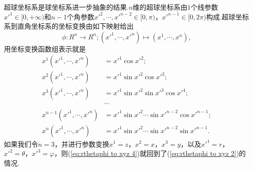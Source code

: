 		超球坐标系是球坐标系进一步抽象的结果.$n$维的超球坐标系由$1$个线参数$x'^1\in[0,+\infty)$和$n-1$个角参数$x'^2,\cdots,x'^{n-2}\in[0,\pi)$，$x'^{n-1}\in[0,2\pi)$构成.超球坐标系到直角坐标系的坐标变换由如下映射给出
		\begin{equation}\label{eq:rthetaphi to xyz 3}
			\phi:R^n\rightarrow R^n;(x'^1,\cdots,x'^n)\mapsto(x^1,\cdots,x^n),
		\end{equation}
		用坐标变换函数组表示就是
		\begin{equation}\label{eq:rthetaphi to xyz 4}
			\begin{split}
				x^1(x'^1,\cdots,x'^n)&=x'^1\cos x'^2;\\
				x^2(x'^1,\cdots,x'^n)&=x'^1\sin x'^2\cos x'^3;\\
				x^3(x'^1,\cdots,x'^n)&=x'^1\sin x'^2\sin x'^3\cos x'^4;\\
				&\cdots\\
				x^{n-1}(x'^1,\cdots,x'^n)&=x'^1\sin x'^2\cdots \sin x'^{n-2}\cos x'^{n-1};\\
				x^{n}(x'^1,\cdots,x'^n)&=x'^1\sin x'^2\cdots \sin x'^{n-2}\sin x'^{n-1}.
			\end{split}
		\end{equation}
		如果我们令$n=3$，并进行参数变换$x^1=z$，$x^2=x$，$x^3=y$，以及$x'^1=r$，$x'^2=\theta$，$x'^3=\varphi$，则(\ref{eq:rthetaphi to xyz 4})就回到了(\ref{eq:rthetaphi to xyz 2})的情况.
